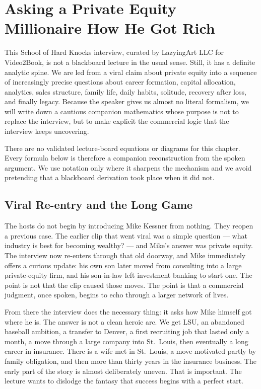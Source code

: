 \chapter{Asking a Private Equity Millionaire How He Got Rich}

This School of Hard Knocks interview, curated by LazyingArt LLC for Video2Book, is not a blackboard lecture in the usual sense. Still, it has a definite analytic spine. We are led from a viral claim about private equity into a sequence of increasingly precise questions about career formation, capital allocation, analytics, sales structure, family life, daily habits, solitude, recovery after loss, and finally legacy. Because the speaker gives us almost no literal formalism, we will write down a cautious companion mathematics whose purpose is not to replace the interview, but to make explicit the commercial logic that the interview keeps uncovering.

\begin{remark}
There are no validated lecture-board equations or diagrams for this chapter. Every formula below is therefore a companion reconstruction from the spoken argument. We use notation only where it sharpens the mechanism and we avoid pretending that a blackboard derivation took place when it did not.
\end{remark}

\section{Viral Re-entry and the Long Game}

The hosts do not begin by introducing Mike Kessner from nothing. They reopen a previous case. The earlier clip that went viral was a simple question --- what industry is best for becoming wealthy? --- and Mike's answer was private equity. The interview now re-enters through that old doorway, and Mike immediately offers a curious update: his own son later moved from consulting into a large private-equity firm, and his son-in-law left investment banking to start one. The point is not that the clip caused those moves. The point is that a commercial judgment, once spoken, begins to echo through a larger network of lives.

From there the interview does the necessary thing: it asks how Mike himself got where he is. The answer is not a clean heroic arc. We get LSU, an abandoned baseball ambition, a transfer to Denver, a first recruiting job that lasted only a month, a move through a large company into St.~Louis, then eventually a long career in insurance. There is a wife met in St.~Louis, a move motivated partly by family obligation, and then more than thirty years in the insurance business. The early part of the story is almost deliberately uneven. That is important. The lecture wants to dislodge the fantasy that success begins with a perfect start.

